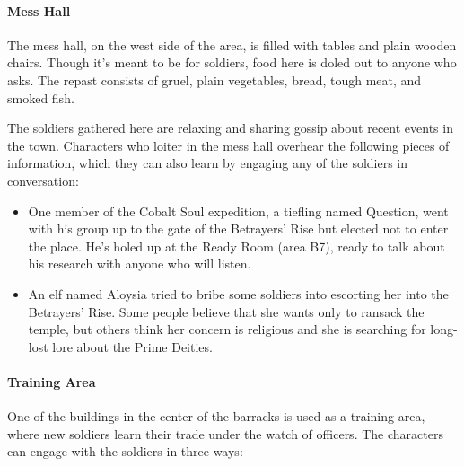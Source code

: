 \documentclass[10pt,a4paper,twoside,bg=print,twocolumn,openany,nodeprecatedcode]{dndbook}
\begin{document}
\paragraph{Mess Hall}
The mess hall, on the west side of the area, is filled with tables and plain wooden chairs. Though it's meant to be for soldiers, food here is doled out to anyone who asks. The repast consists of gruel, plain vegetables, bread, tough meat, and smoked fish.

The soldiers gathered here are relaxing and sharing gossip about recent events in the town. Characters who loiter in the mess hall overhear the following pieces of information, which they can also learn by engaging any of the soldiers in conversation:


\begin{itemize}
\item One member of the Cobalt Soul expedition, a tiefling named Question, went with his group up to the gate of the Betrayers' Rise but elected not to enter the place. He's holed up at the Ready Room (area B7), ready to talk about his research with anyone who will listen.
\item An elf named Aloysia tried to bribe some soldiers into escorting her into the Betrayers' Rise. Some people believe that she wants only to ransack the temple, but others think her concern is religious and she is searching for long-lost lore about the Prime Deities.
\end{itemize}

\paragraph{Training Area}
One of the buildings in the center of the barracks is used as a training area, where new soldiers learn their trade under the watch of officers. The characters can engage with the soldiers in three ways:
\end{document}
